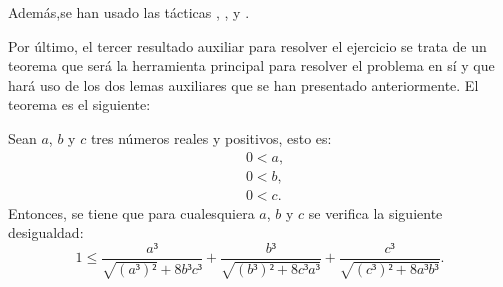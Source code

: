 Además,se han usado las tácticas
,
,
 y
.

Por último, el tercer resultado auxiliar para resolver el ejercicio
se trata de un teorema que será la herramienta principal para
resolver el problema en sí y que hará uso de los dos lemas auxiliares
que se han presentado anteriormente. El teorema es el siguiente:
\begin{teorema}\label{teoremaaux}
  Sean \(a\), \(b\) y \(c\) tres números reales y positivos, esto es:
  \begin{align}
    &0 < a, \label{haq2t}\tag{ha}\\
    &0 < b, \label{hbq2t}\tag{hb}\\
    &0 < c. \label{hcq2t}\tag{hc}
  \end{align}
  Entonces, se tiene que para cualesquiera \(a\), \(b\) y \(c\) se
  verifica la siguiente desigualdad:
  \begin{equation}\label{eqteorema}
    1 ≤ \frac{a³}{\sqrt{(a³)²}+8b³c³}+\frac{b³}{\sqrt{(b³)²+8c³a³}}+
    \frac{c³}{\sqrt{(c³)²+8a³b³}}.
  \end{equation}
\end{teorema}

